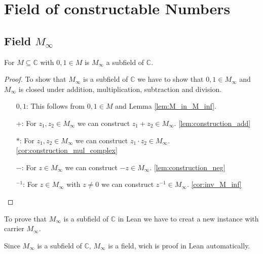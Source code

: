 \chapter{Field of constructable Numbers}
\section[Filed of Constructable Numbers]{Field $M_{\infty}$}
\begin{theorem}
    \label{thm:MField}
    \leanok
    For $M\subseteq \mathbb{C}$ with $0,1 \in M$ is $M_{\infty}$ a subfield of $\mathbb{C}$.
\end{theorem}
\begin{proof}
    To show that $M_{\infty}$ is a subfield of $\mathbb{C}$ we have to show that $0,1\in M_{\infty}$ and $M_{\infty}$ is closed under addition, multiplication, subtraction and division.
    \begin{itemize}
        \item [$0,1$:] This follows from $0,1 \in M$ and Lemma \ref{lem:M_in_M_inf}.
        \item [$+$:] For $z_1,z_2 \in M_{\infty}$ we can construct $z_1 + z_2 \in M_{\infty}$. \ref{lem:construction_add}
        \item [$*$:] For $z_1,z_2 \in M_{\infty}$ we can construct $z_1 \cdot z_2 \in M_{\infty}$. \ref{cor:construction_mul_complex}
        \item [$-$:] For $z \in M_{\infty}$ we can construct $-z \in M_{\infty}$. \ref{lem:construction_neg}
        \item [$^{-1}$:] For $z \in M_{\infty}$ with $z \ne 0$ we can construct $z^{-1} \in M_{\infty}$. \ref{cor:inv_M_inf}
    \end{itemize}
\end{proof}

\begin{remark}
   To prove that $M_{\infty}$ is a subfield of $\mathbb{C}$ in Lean we have to creat a new instance with carrier $M_{\infty}$.
\end{remark}
\begin{remark}
    \label{rem:MField_Field}
    Since $M_{\infty}$ is a subfield of $\mathbb{C}$, $M_{\infty}$ is a field, wich is proof in Lean automatically.
\end{remark}


